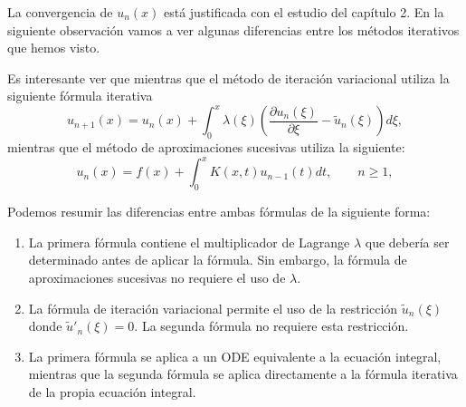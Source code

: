 La convergencia de $u_n(x)$ está justificada con el estudio del capítulo 2.
En la siguiente observación vamos a ver algunas diferencias entre los métodos iterativos que hemos visto.
\begin{observacion}
	Es interesante ver que mientras que el método de iteración variacional utiliza la siguiente fórmula iterativa
	\begin{equation}
		u_{n+1}(x) = u_n(x) + \int_{0}^{x} \lambda(\xi)(\dfrac{\partial u_n(\xi)}{\partial \xi}-\tilde{u}_n(\xi))d\xi,
	\end{equation}
	mientras que el método de aproximaciones sucesivas utiliza la siguiente:
	\begin{equation}
		u_n(x) = f(x) + \int_{0}^{x} K(x,t)u_{n-1}(t)dt, \qquad n \geqslant 1,
	\end{equation}
\end{observacion}
Podemos resumir las diferencias entre ambas fórmulas de la siguiente forma:
\begin{enumerate}
	\item La primera fórmula contiene el multiplicador de Lagrange $\lambda$ que debería ser determinado antes de aplicar la fórmula. Sin embargo, la fórmula de aproximaciones sucesivas no requiere el uso de $\lambda$.
	\item La fórmula de iteración variacional permite el uso de la restricción $\tilde{u}_n(\xi)$ donde $\tilde{u}'_n(\xi) = 0.$ La segunda fórmula no requiere esta restricción.
	\item La primera fórmula se aplica a un ODE equivalente a la ecuación integral, mientras que la segunda fórmula se aplica directamente a la fórmula iterativa de la propia ecuación integral.
\end{enumerate}

